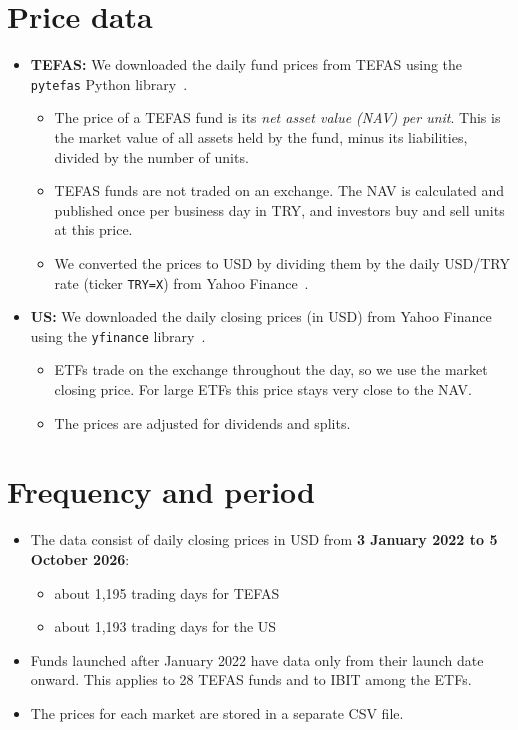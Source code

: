 \documentclass[11pt,a4paper]{article}
\begin{document}
\section{Price data}
\begin{itemize}
  \item \textbf{TEFAS:} We downloaded the daily fund prices from TEFAS using the
        \texttt{pytefas} Python library~\cite{pytefas}.
        \begin{itemize}
          \item The price of a TEFAS fund is its \emph{net asset value (NAV) per unit}. This
                is the market value of all assets held by the fund, minus its liabilities,
                divided by the number of units.
          \item TEFAS funds are not traded on an exchange. The NAV is calculated and
                published once per business day in TRY, and investors buy and sell units at
                this price.
          \item We converted the prices to USD by dividing them by the daily USD/TRY rate
                (ticker \texttt{TRY=X}) from Yahoo Finance~\cite{yahoo}.
        \end{itemize}
  \item \textbf{US:} We downloaded the daily closing prices (in USD) from Yahoo
        Finance~\cite{yahoo} using the \texttt{yfinance} library~\cite{yfinance}.
        \begin{itemize}
          \item ETFs trade on the exchange throughout the day, so we use the market closing
                price. For large ETFs this price stays very close to the NAV.
          \item The prices are adjusted for dividends and splits.
        \end{itemize}
\end{itemize}

\section{Frequency and period}
\begin{itemize}
  \item The data consist of daily closing prices in USD from \textbf{3 January 2022 to
        5 October 2026}:
        \begin{itemize}
          \item about 1{,}195 trading days for TEFAS
          \item about 1{,}193 trading days for the US
        \end{itemize}
  \item Funds launched after January 2022 have data only from their launch date onward.
        This applies to 28 TEFAS funds and to IBIT among the ETFs.
  \item The prices for each market are stored in a separate CSV file.
\end{itemize}
\end{document}
